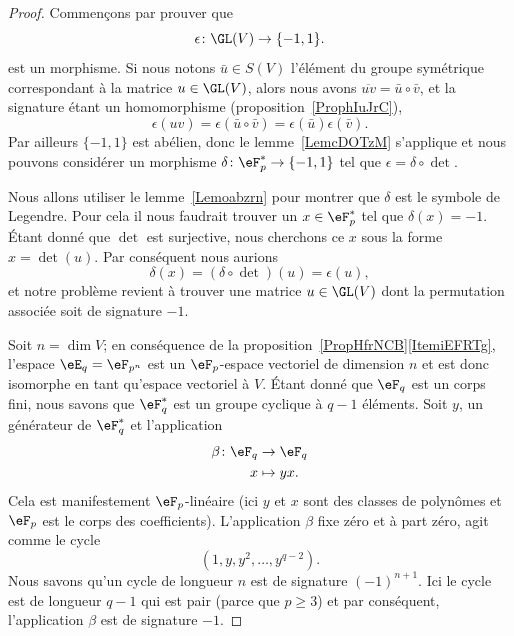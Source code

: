 \begin{proof}
    Commençons par prouver que
    \begin{equation}
        \epsilon\colon \GL(V)\to \{ -1,1 \}.
    \end{equation}
    est un morphisme. Si nous notons \( \bar u\in S(V)\) l'élément du groupe symétrique correspondant à la matrice \( u\in \GL(V)\), alors nous avons \( \overline{ uv }=\bar u\circ\bar v\), et la signature étant un homomorphisme (proposition~\ref{ProphIuJrC}),
    \begin{equation}
        \epsilon(uv)=\epsilon(\bar u\circ\bar v)=\epsilon(\bar u)\epsilon(\bar v).
    \end{equation}
    Par ailleurs \( \{ -1,1 \}\) est abélien, donc le lemme~\ref{LemcDOTzM} s'applique et nous pouvons considérer un morphisme \( \delta\colon \eF_p^*\to \{ -1,1 \}\) tel que \( \epsilon=\delta\circ\det\).

    Nous allons utiliser le lemme~\ref{Lemoabzrn} pour montrer que \( \delta\) est le symbole de Legendre. Pour cela il nous faudrait trouver un \( x\in \eF_p^*\) tel que \( \delta(x)=-1\). Étant donné que \( \det\) est surjective, nous cherchons ce \( x\) sous la forme \( x=\det(u)\). Par conséquent nous aurions
    \begin{equation}
        \delta(x)=(\delta\circ\det)(u)=\epsilon(u),
    \end{equation}
    et notre problème revient à trouver une matrice \( u\in\GL(V)\) dont la permutation associée soit de signature \( -1\).

    Soit \( n=\dim V\); en conséquence de la proposition~\ref{PropHfrNCB}\ref{ItemiEFRTg}, l'espace \( \eE_q=\eF_{p^n}\) est un \( \eF_p\)-espace vectoriel de dimension \( n\) et est donc isomorphe en tant qu'espace vectoriel à \( V\). Étant donné que \( \eF_q\) est un corps fini, nous savons que \( \eF_q^*\) est un groupe cyclique à \( q-1\) éléments. Soit \( y\), un générateur de \( \eF_q^*\) et l'application
    \begin{equation}
        \begin{aligned}
            \beta\colon \eF_q&\to \eF_q \\
            x&\mapsto yx.
        \end{aligned}
    \end{equation}
    Cela est manifestement \( \eF_p\)-linéaire (ici \( y\) et \( x\) sont des classes de polynômes et \( \eF_p\) est le corps des coefficients). L'application \( \beta\) fixe zéro et à part zéro, agit comme le cycle
    \begin{equation}
        (1,y,y^2,\ldots, y^{q-2}).
    \end{equation}
    Nous savons qu'un cycle de longueur \( n\) est de signature \( (-1)^{n+1}\). Ici le cycle est de longueur \( q-1\) qui est pair (parce que \( p\geq 3\)) et par conséquent, l'application \( \beta\) est de signature \( -1\).
\end{proof}

